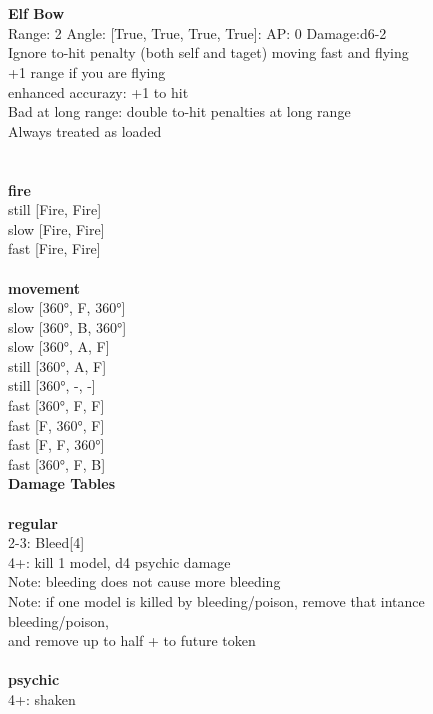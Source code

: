 \ \\

\ \\
{\bf Elf Bow } \\



Range: 2  Angle: [True, True, True, True]: AP: 0 Damage:d6-2 \\
Ignore to-hit penalty (both self and taget) moving fast and flying\\ 
+1 range if you are flying\\ 
enhanced accurazy: +1 to hit\\ 
Bad at long range: double to-hit penalties at long range\\ 
Always treated as loaded\\ 




 
\ \\



\ \\ {\bf fire } \\
still [Fire, Fire] \\
slow [Fire, Fire] \\
fast [Fire, Fire] \\
\ \\ {\bf movement } \\
slow [360°, F, 360°] \\
slow [360°, B, 360°] \\
slow [360°, A, F] \\
still [360°, A, F] \\
still [360°, -, -] \\
fast [360°, F, F] \\
fast [F, 360°, F] \\
fast [F, F, 360°] \\
fast [360°, F, B] \\


{\bf Damage Tables} \\
\ \\ {\bf regular } \\
2-3: Bleed[4] \\
4+: kill 1 model, d4 psychic damage \\
Note: bleeding does not cause more bleeding \\
Note: if one model is killed by bleeding/poison, remove that intance bleeding/poison, \\ and remove up to half + to future token \\
\ \\ {\bf psychic } \\
4+: shaken \\











